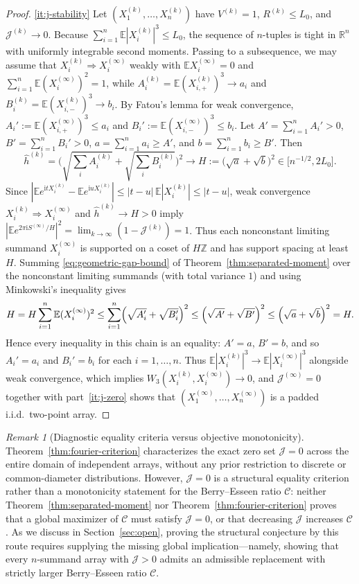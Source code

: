 \documentclass[11pt]{article}
\numberwithin{equation}{section}
\theoremstyle{definition}
\theoremstyle{remark}
\newtheorem{remark}[theorem]{Remark}
\newcommand{\E}{\mathbb E}
\newcommand{\R}{\mathbb R}
\newcommand{\Z}{\mathbb Z}
\newcommand{\ii}{\mathrm i}
\begin{document}
\begin{proof}
\ref{it:j-stability} Let $(X_1^{(k)},\ldots,X_n^{(k)})$ have $V^{(k)}=1$,
$R^{(k)}\le L_0$, and $\mathcal J^{(k)}\to0$. Because
$\sum_{i=1}^n\E|X_i^{(k)}|^3\le L_0$, the sequence of $n$-tuples is tight in
$\R^n$ with uniformly integrable second moments. Passing to a subsequence, we
may assume that $X_i^{(k)}\Rightarrow X_i^{(\infty)}$ weakly with
$\E X_i^{(\infty)}=0$ and $\sum_{i=1}^n\E(X_i^{(\infty)})^2=1$, while
$A_i^{(k)}=\E(X_{i,+}^{(k)})^3\to a_i$ and
$B_i^{(k)}=\E(X_{i,-}^{(k)})^3\to b_i$. By Fatou's lemma for weak convergence,
$A_i':=\E(X_{i,+}^{(\infty)})^3\le a_i$ and
$B_i':=\E(X_{i,-}^{(\infty)})^3\le b_i$. Let $A'=\sum_{i=1}^n A_i'>0$,
$B'=\sum_{i=1}^n B_i'>0$, $a=\sum_{i=1}^n a_i\ge A'$, and
$b=\sum_{i=1}^n b_i\ge B'$. Then
\[
 \widehat h^{(k)}=\bigl(\sqrt{\textstyle\sum_i A_i^{(k)}}+\sqrt{\textstyle\sum_i B_i^{(k)}}\bigr)^2
 \longrightarrow H:=\bigl(\sqrt a+\sqrt b\bigr)^2\in\bigl[n^{-1/2},2L_0\bigr].
\]
Since $|\E e^{\ii t X_i^{(k)}}-\E e^{\ii u X_i^{(k)}}|\le|t-u|\,\E|X_i^{(k)}|\le|t-u|$,
weak convergence $X_i^{(k)}\Rightarrow X_i^{(\infty)}$ and
$\widehat h^{(k)}\to H>0$ imply
$|\E e^{2\pi\ii S^{(\infty)}/H}|^2=\lim_{k\to\infty}(1-\mathcal J^{(k)})=1$.
Thus each nonconstant limiting summand $X_i^{(\infty)}$ is supported on a
coset of $H\Z$ and has support spacing at least $H$. Summing
\eqref{eq:geometric-gap-bound} of Theorem~\ref{thm:separated-moment} over the
nonconstant limiting summands (with total variance $1$) and using Minkowski's
inequality gives
\[
 H=H\sum_{i=1}^n\E(X_i^{(\infty)})^2
 \le\sum_{i=1}^n\Bigl(\sqrt{A_i'}+\sqrt{B_i'}\Bigr)^2
 \le\Bigl(\sqrt{A'}+\sqrt{B'}\Bigr)^2
 \le\Bigl(\sqrt a+\sqrt b\Bigr)^2=H.
\]
Hence every inequality in this chain is an equality: $A'=a$, $B'=b$, and so
$A_i'=a_i$ and $B_i'=b_i$ for each $i=1,\ldots,n$. Thus
$\E|X_i^{(k)}|^3\to\E|X_i^{(\infty)}|^3$ alongside weak convergence, which
implies $W_3(X_i^{(k)},X_i^{(\infty)})\to0$, and $\mathcal J^{(\infty)}=0$
together with part~\ref{it:j-zero} shows that $(X_1^{(\infty)},\ldots,X_n^{(\infty)})$
is a padded i.i.d.\ two-point array.
\end{proof}

\begin{remark}[Diagnostic equality criteria versus objective monotonicity]\label{rem:j-not-monotone}
Theorem~\ref{thm:fourier-criterion} characterizes the exact zero set
$\mathcal J=0$ across the entire domain of independent arrays, without any
prior restriction to discrete or common-diameter distributions. However,
$\mathcal J=0$ is a structural equality criterion rather than a monotonicity
statement for the Berry--Esseen ratio $\mathcal C$: neither
Theorem~\ref{thm:separated-moment} nor Theorem~\ref{thm:fourier-criterion}
proves that a global maximizer of $\mathcal C$ must satisfy $\mathcal J=0$,
or that decreasing $\mathcal J$ increases $\mathcal C$. As we discuss in
Section~\ref{sec:open}, proving the structural conjecture by this route
requires supplying the missing global implication---namely, showing that every
$n$-summand array with $\mathcal J>0$ admits an admissible replacement with
strictly larger Berry--Esseen ratio $\mathcal C$.
\end{remark}
\end{document}
